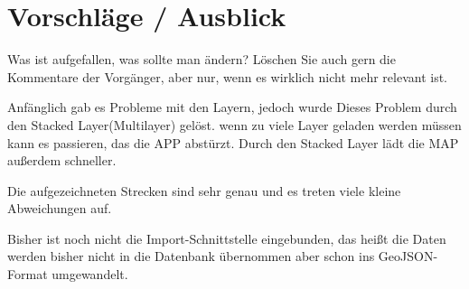 \section{Vorschläge / Ausblick}
Was ist aufgefallen, was sollte man ändern? Löschen Sie auch gern die Kommentare
der Vorgänger, aber nur, wenn es wirklich nicht mehr relevant ist.

Anfänglich gab es Probleme mit den Layern, jedoch wurde Dieses Problem durch den Stacked Layer(Multilayer) gelöst. wenn zu viele Layer geladen werden müssen kann es passieren, das die APP abstürzt. Durch den Stacked Layer lädt die MAP außerdem schneller.

Die aufgezeichneten Strecken sind sehr genau und es treten viele kleine Abweichungen auf.

Bisher ist noch nicht die Import-Schnittstelle eingebunden, das heißt die Daten werden bisher nicht in die Datenbank übernommen aber schon ins GeoJSON-Format umgewandelt.


